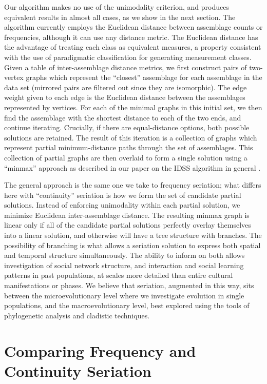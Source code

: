Our algorithm makes no use of the unimodality criterion, and produces
equivalent results in almost all cases, as we show in the next section.
The algorithm currently employs the Euclidean distance between
assemblage counts or frequencies, although it can use any distance
metric. The Euclidean distance has the advantage of treating each class
as equivalent measures, a property consistent with the use of
paradigmatic classification \citep[sensu][]{Dunnell1971} for generating
measurement classes. Given a table of inter-assemblage distance metrics,
we first construct pairs of two-vertex graphs which represent the
``closest'' assemblage for each assemblage in the data set (mirrored
pairs are filtered out since they are isomorphic). The edge weight given
to each edge is the Euclidean distance between the assemblages
represented by vertices. For each of the minimal graphs in this initial
set, we then find the assemblage with the shortest distance to each of
the two ends, and continue iterating. Crucially, if there are
equal-distance options, both possible solutions are retained. The result
of this iteration is a collection of graphs which represent partial
minimum-distance paths through the set of assemblages. This collection
of partial graphs are then overlaid to form a single solution using a
``minmax'' approach as described in our paper on the IDSS algorithm in
general \citep{lipomadsendunnell2015}.

The general approach is the same one we take to frequency seriation;
what differs here with ``continuity'' seriation is how we form the set
of candidate partial solutions. Instead of enforcing unimodality within
each partial solution, we minimize Euclidean inter-assemblage distance.
The resulting minmax graph is linear only if all of the candidate
partial solutions perfectly overlay themselves into a linear solution,
and otherwise will have a tree structure with branches. The possibility
of branching is what allows a seriation solution to express both spatial
and temporal structure simultaneously. The ability to inform on both
allows investigation of social network structure, and interaction and
social learning patterns in past populations, at scales more detailed
than entire cultural manifestations or phases. We believe that
seriation, augmented in this way, sits between the microevolutionary
level where we investigate evolution in single populations, and the
macroevolutionary level, best explored using the tools of phylogenetic
analysis and cladistic techniques.

\section{Comparing Frequency and Continuity
Seriation}\label{comparing-frequency-and-continuity-seriation}

